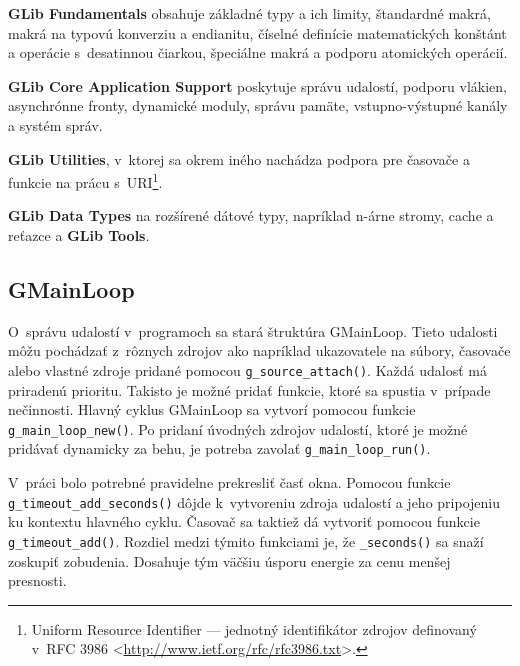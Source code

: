 \documentclass[12pt,oneside,final]{fithesis2}
\begin{document}
\textbf{GLib Fundamentals} obsahuje základné typy a ich limity, štandardné makrá, makrá na typovú konverziu a endianitu, číselné definície matematických konštánt a operácie s~desatinnou čiarkou, špeciálne makrá a podporu atomických operácií.

\textbf{GLib Core Application Support} poskytuje správu udalostí, podporu vlákien, asynchrónne fronty, dynamické moduly, správu pamäte, vstupno-výstupné kanály a systém správ.
 
\textbf{GLib Utilities}, v~ktorej sa okrem iného nachádza podpora pre časovače a funkcie na prácu s~URI\footnote{Uniform Resource Identifier --- jednotný identifikátor zdrojov definovaný v~RFC 3986 <\url{http://www.ietf.org/rfc/rfc3986.txt}>.}.

\textbf{GLib Data Types} na rozšírené dátové typy, napríklad n-árne stromy, cache a reťazce a \textbf{GLib Tools}.

\subsection{GMainLoop}
O~správu udalostí v~programoch sa stará štruktúra GMainLoop. Tieto udalosti môžu pochádzať z~rôznych zdrojov ako napríklad ukazovatele na súbory, časovače alebo vlastné zdroje pridané pomocou \texttt{g\_source\_attach()}. Každá udalosť má priradenú prioritu. Takisto je možné pridať funkcie, ktoré sa spustia v~prípade nečinnosti. Hlavný cyklus GMainLoop sa vytvorí pomocou funkcie \texttt{g\_main\_loop\_new()}. Po pridaní úvodných zdrojov udalostí, ktoré je možné pridávať dynamicky za behu, je potreba zavolať \texttt{g\_main\_loop\_run()}.

V~práci bolo potrebné pravidelne prekresliť časť okna. Pomocou funkcie \texttt{g\_timeout\_add\_seconds()} dôjde k~vytvoreniu zdroja udalostí a jeho pripojeniu ku kontextu hlavného cyklu. Časovač sa taktiež dá vytvoriť pomocou funkcie \texttt{g\_timeout\_add()}. Rozdiel medzi týmito funkciami je, že \texttt{\_seconds()} sa snaží zoskupiť zobudenia. Dosahuje tým väčšiu úsporu energie za cenu menšej presnosti.
\end{document}
